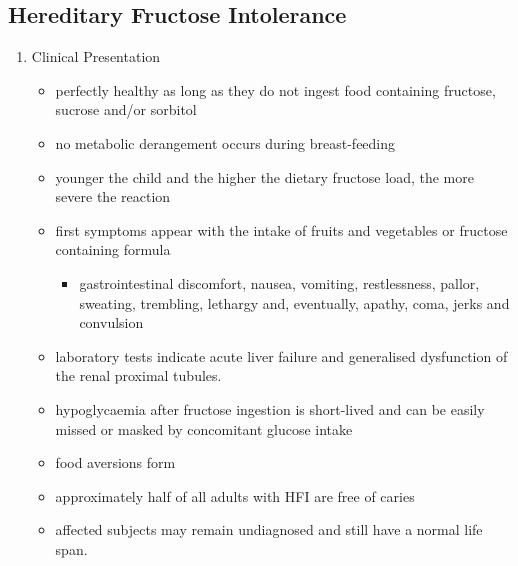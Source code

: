 \documentclass{scrartcl}
\begin{document}
\subsection{Hereditary Fructose Intolerance}
\label{sec:org87693a2}
\begin{enumerate}
\item Clinical Presentation
\label{sec:orgc3fb092}
\begin{itemize}
\item perfectly healthy as long as they do not ingest food containing fructose, sucrose and/or sorbitol
\item no metabolic derangement occurs during breast-feeding
\item younger the child and the higher the dietary fructose load, the more severe the reaction
\item first symptoms appear with the intake of fruits and vegetables or fructose containing formula
\begin{itemize}
\item gastrointestinal discomfort, nausea, vomiting, restlessness,
pallor, sweating, trembling, lethargy and, eventually, apathy,
coma, jerks and convulsion
\end{itemize}
\item laboratory tests indicate acute liver failure and generalised dysfunction of the renal proximal tubules.
\item hypoglycaemia after fructose ingestion is short-lived and can be easily missed or masked by concomitant glucose intake
\item food aversions form
\item approximately half of all adults with HFI are free of caries
\item affected subjects may remain undiagnosed and still have a normal life span.
\end{itemize}


\end{enumerate}
\end{document}
